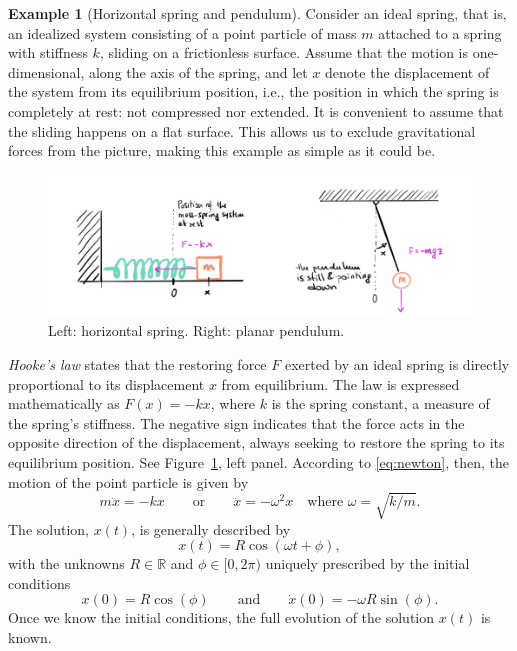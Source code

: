 \documentclass[english,fontsize=11pt,paper=b5]{scrbook}
\numberwithin{equation}{chapter}
\theoremstyle{definition}
\newtheorem{example}{Example}[chapter]
\begin{document}
  \begin{example}[Horizontal spring and pendulum]\label{ex:sprPen}
    Consider an ideal spring, that is, an idealized system consisting of a point particle of mass $m$ attached to a spring with stiffness $k$, sliding on a frictionless surface.
    Assume that the motion is one-dimensional, along the axis of the spring, and let $x$ denote the displacement of the system from its equilibrium position, i.e., the position in which the spring is completely at rest: not compressed nor extended.
    It is convenient to assume that the sliding happens on a flat surface.
    This allows us to exclude gravitational forces from the picture, making this example as simple as it could be.

    \begin{figure}[ht!]
      \centering
      \includegraphics[width=\linewidth]{images/HM-1-2.pdf}
      \caption{Left: horizontal spring. Right: planar pendulum.}%
      \label{fig:spring-pendulum}
    \end{figure}

    \emph{Hooke's law}  states that the restoring force $F$ exerted by an ideal spring is directly proportional to its displacement $x$ from equilibrium.
    The law is expressed mathematically as $F(x) = -kx$, where $k$ is the spring constant, a measure of the spring's stiffness.
    The negative sign indicates that the force acts in the opposite direction of the displacement, always seeking to restore the spring to its equilibrium position. See Figure~\ref{fig:spring-pendulum}, left panel.
    According to \eqref{eq:newton}, then, the motion of the point particle is given by
    \begin{equation}\label{eq:spring}
      m \ddot{x} = - k x \qquad\mbox{or}\qquad \ddot{x} = - \omega^2 x \quad\mbox{where } \omega = \sqrt{k/m}.
    \end{equation}
    The solution, $x(t)$, is generally described by
    \begin{equation}\label{eq:springsol}
      x(t) = R \cos(\omega t + \phi),
    \end{equation} with the unknowns $R\in\mathbb{R}$ and $\phi\in[0,2\pi)$ uniquely prescribed by the initial conditions
    \begin{equation}
      x(0) = R\cos(\phi) \qquad\mbox{and}\qquad \dot x(0) = -\omega R \sin(\phi).
    \end{equation}
    Once we know the initial conditions, the full evolution of the solution $x(t)$ is known.
    \medskip


\end{example}
\end{document}
